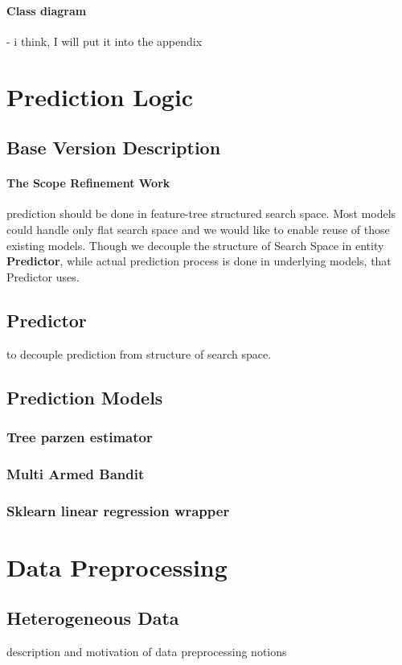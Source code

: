 \paragraph{Class diagram} - i think, I will put it into the appendix


\section{Prediction Logic}\label{implementation: prediction logic}
\subsection{Base Version Description}
\paragraph{The Scope Refinement Work} prediction should be done in feature-tree structured search space. Most models could handle only flat search space and we would like to enable reuse of those existing models. Though we decouple the structure of Search Space in entity \textbf{Predictor}, while actual prediction process is done in underlying models, that Predictor uses.

\subsection{Predictor}
to decouple prediction from structure of search space.

\subsection{Prediction Models}
\subsubsection{Tree parzen estimator}
\subsubsection{Multi Armed Bandit}
\subsubsection{Sklearn linear regression wrapper}


\section{Data Preprocessing}
\subsection{Heterogeneous Data} description and motivation of data preprocessing notions

